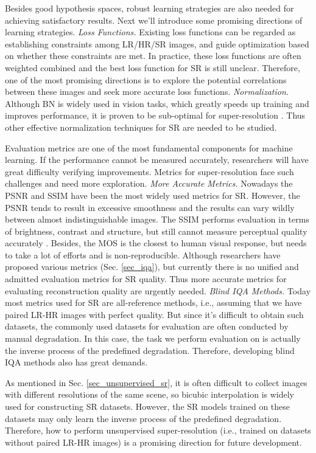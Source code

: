 {Besides good hypothesis spaces, robust learning strategies are also needed for achieving satisfactory results.
Next we'll introduce some promising directions of learning strategies.
\textit{Loss Functions.}
Existing loss functions can be regarded as establishing constraints among LR/HR/SR images, and guide optimization based on whether these constraints are met.
In practice, these loss functions are often weighted combined and the best loss function for SR is still unclear.
Therefore, one of the most promising directions is to explore the potential correlations between these images and seek more accurate loss functions.
\textit{Normalization.}
Although BN is widely used in vision tasks, which greatly speeds up training and improves performance, it is proven to be sub-optimal for super-resolution .
Thus other effective normalization techniques for SR are needed to be studied.

Evaluation metrics are one of the most fundamental components for machine learning.
If the performance cannot be measured accurately, researchers will have great difficulty verifying improvements.
Metrics for super-resolution face such challenges and need more exploration.
\textit{More Accurate Metrics.}
Nowadays the PSNR and SSIM have been the most widely used metrics for SR.
However, the PSNR tends to result in excessive smoothness and the results can vary wildly between almost indistinguishable images.
The SSIM  performs evaluation in terms of brightness, contrast and structure, but still cannot measure perceptual quality accurately .
Besides, the MOS is the closest to human visual response, but needs to take a lot of efforts and is non-reproducible.
Although researchers have proposed various metrics (Sec. \ref{sec_iqa}), but currently there is no unified and admitted evaluation metrics for SR quality.
Thus more accurate metrics for evaluating reconstruction quality are urgently needed.
\textit{Blind IQA Methods.}
Today most metrics used for SR are all-reference methods, i.e., assuming that we have paired LR-HR images with perfect quality.
But since it's difficult to obtain such datasets, the commonly used datasets for evaluation are often conducted by manual degradation.
In this case, the task we perform evaluation on is actually the inverse process of the predefined degradation.
Therefore, developing blind IQA methods also has great demands.

As mentioned in Sec. \ref{sec_unsupervised_sr}, it is often difficult to collect images with different resolutions of the same scene, so bicubic interpolation is widely used for constructing SR datasets.
However, the SR models trained on these datasets may only learn the inverse process of the predefined degradation.
Therefore, how to perform unsupervised super-resolution (i.e., trained on datasets without paired LR-HR images) is a promising direction for future development.

}
